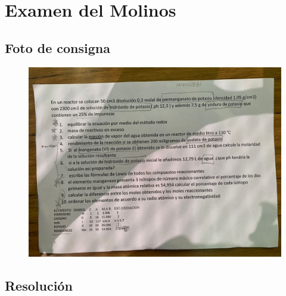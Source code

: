 \section*{Examen del Molinos}

\subsection*{Foto de consigna}
\begin{figure}[H]
    \centering
    \includegraphics[width=0.7\linewidth, angle=90]{Images/molinos_examen1.jpg}
\end{figure}

\subsection*{Resolución}

